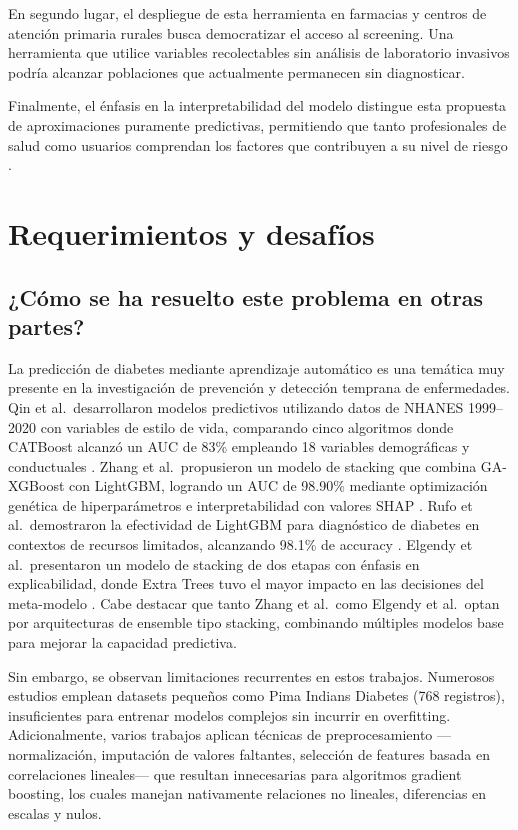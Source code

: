 \documentclass[12pt, a4paper]{report}
\begin{document}
En segundo lugar, el despliegue de esta herramienta en farmacias y centros de atención primaria rurales busca democratizar el acceso al screening. Una herramienta que utilice variables recolectables sin análisis de laboratorio invasivos podría alcanzar poblaciones que actualmente permanecen sin diagnosticar.

Finalmente, el énfasis en la interpretabilidad del modelo distingue esta propuesta de aproximaciones puramente predictivas, permitiendo que tanto profesionales de salud como usuarios comprendan los factores que contribuyen a su nivel de riesgo \citep{li2024diabetes}.


\chapter{Requerimientos y desafíos}


\section{¿Cómo se ha resuelto este problema en otras partes?}

La predicción de diabetes mediante aprendizaje automático es una temática muy presente en la investigación de prevención y detección temprana de enfermedades. Qin et al.\ desarrollaron modelos predictivos utilizando datos de NHANES 1999--2020 con variables de estilo de vida, comparando cinco algoritmos donde CATBoost alcanzó un AUC de 83\% empleando 18 variables demográficas y conductuales \citep{qin2022machine}. Zhang et al.\ propusieron un modelo de stacking que combina GA-XGBoost con LightGBM, logrando un AUC de 98.90\% mediante optimización genética de hiperparámetros e interpretabilidad con valores SHAP \citep{li2024diabetes}. Rufo et al.\ demostraron la efectividad de LightGBM para diagnóstico de diabetes en contextos de recursos limitados, alcanzando 98.1\% de accuracy \citep{rufo2021diagnosis}. Elgendy et al.\ presentaron un modelo de stacking de dos etapas con énfasis en explicabilidad, donde Extra Trees tuvo el mayor impacto en las decisiones del meta-modelo \citep{elgendy2025dual}. Cabe destacar que tanto Zhang et al.\ como Elgendy et al.\ optan por arquitecturas de ensemble tipo stacking, combinando múltiples modelos base para mejorar la capacidad predictiva.

Sin embargo, se observan limitaciones recurrentes en estos trabajos. Numerosos estudios emplean datasets pequeños como Pima Indians Diabetes (768 registros), insuficientes para entrenar modelos complejos sin incurrir en overfitting. Adicionalmente, varios trabajos aplican técnicas de preprocesamiento —normalización, imputación de valores faltantes, selección de features basada en correlaciones lineales— que resultan innecesarias para algoritmos gradient boosting, los cuales manejan nativamente relaciones no lineales, diferencias en escalas y nulos.
\end{document}
